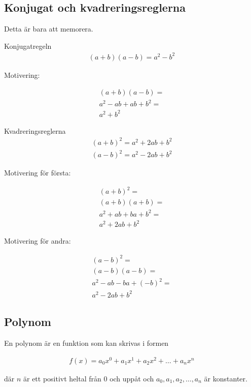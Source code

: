 \subsection{Konjugat och kvadreringsreglerna}

Detta är bara att memorera. \bigskip

\begin{theorem}{Konjugatregeln}
	\begin{align}
	(a+b)(a-b) = a^2-b^2
	\end{align}
\end{theorem}

Motivering:

\begin{align}
	(a+b)(a-b) = \\ 
	a^2 - ab + ab + b^2 = \\
	a^2 + b^2
\end{align}

\begin{theorem}{Kvadreringsreglerna}
	\begin{align}
		(a+b)^2 = a^2+2ab+b^2 \\
		(a-b)^2 = a^2-2ab+b^2
	\end{align}
\end{theorem}

Motivering för första:

\begin{align}
	(a+b)^2 = \\
	(a+b)(a+b) = \\
	a^2 + ab + ba + b^2 = \\
	a^2 + 2ab + b^2
\end{align}

Motivering för andra:

\begin{align}
	(a-b)^2 = \\
	(a-b)(a-b) = \\
	a^2 - ab - ba + (-b)^2 = \\
	a^2 - 2ab + b^2
\end{align}

\newpage
\subsection{Polynom}

\begin{definition}
	En polynom är en funktion som kan skrivas i formen
	
	\begin{align}
		f(x) = a_0x^0 + a_1x^1 + a_2x^2 + \hdots + a_nx^n
	\end{align}
	
	där $n$ är ett positivt heltal från $0$ och uppåt och $a_0, a_1, a_2, \hdots, a_n$ är konstanter.
\end{definition}

